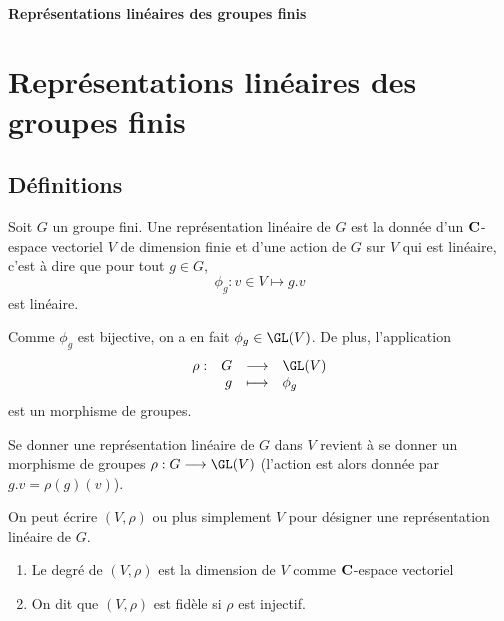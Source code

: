 \ifsolo
    ~

    \vspace{1cm}

    \begin{center}
        \textbf{\LARGE Représentations linéaires des groupes finis} \\[1em]
    \end{center}
    \tableofcontents
\else
    \chapter{Représentations linéaires des groupes finis}

    \minitoc
\fi
\thispagestyle{empty}

\section{Définitions}

\begin{dfn}
    Soit $G $ un groupe fini. Une représentation linéaire de  $G$ est la donnée d'un  $\mathbf C$-espace vectoriel $V$ de dimension finie et d'une action de $G$ sur $V$ qui est linéaire, c'est à dire que pour tout $g  \in  G$, \[\phi_g : v \in  V \longmapsto g.v\] est linéaire.

    Comme $\phi_g$ est bijective, on a en fait  $\phi_g \in  \GL(V)$. De plus, l'application \[
    \begin{array}{rrcl}
        \rho:& G & \longrightarrow & \GL(V) \\
        & g & \longmapsto & \displaystyle \phi_g
    \end{array}
    \] 
    est un morphisme de groupes.
\end{dfn}

\begin{rem}
    Se donner une représentation linéaire de $G$ dans $V$ revient à se donner un morphisme de groupes $\rho : G \longrightarrow  \GL(V)$ (l'action est alors donnée par $g.v=\rho(g)(v)$).
\end{rem}

\begin{rem}[Notation]
    On peut écrire $(V, \rho)$ ou plus simplement  $V$ pour désigner une représentation linéaire de  $G$.
\end{rem}

\begin{dfn}
\begin{enumerate}
    \item Le degré de $(V, \rho)$ est la dimension de  $V$ comme  $\mathbf C$-espace vectoriel
    \item On dit que $(V, \rho)$ est fidèle si  $\rho$ est injectif.
\end{enumerate}
\end{dfn}

